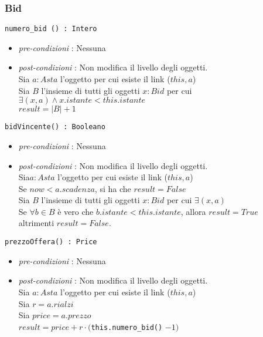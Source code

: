 \documentclass[12pt, letterpaper]{article}
\newcommand{\code}[1]{\colorbox{light-gray}{\texttt{#1}}}
\newcommand{\codee}[1]{\colorbox{white}{\texttt{#1}}}
\begin{document}
\subsubsection{Bid}
\code{numero\_bid () : Intero}\begin{itemize}
    \item \textit{pre-condizioni} : Nessuna
    \item \textit{post-condizioni} : Non modifica il livello degli oggetti.\\ 
    Sia $a:Asta$ l'oggetto per cui esiste il link ($this,a$)\\ 
    Sia $B$ l'insieme di tutti gli oggetti $x:Bid$ per cui $\exists (x,a) \land x.istante<this.istante$\\ 
    $result = |B|+1$ 
\end{itemize}
\code{bidVincente() : Booleano}\begin{itemize}
    \item \textit{pre-condizioni} : Nessuna
    \item \textit{post-condizioni} : Non modifica il livello degli oggetti.\\ 
    Sia$a:Asta$ l'oggetto per cui esiste il link ($this,a$)\\ 
    Se $now<a.scadenza$, si ha che $result=False$\\
    Sia $B$ l'insieme di tutti gli oggetti $x:Bid$ per cui $\exists (x,a)$\\
    Se $\forall b\in B$ è vero che $b.istante<this.istante$, allora $result=True$\\
    altrimenti $result=False$.
\end{itemize}
\code{prezzoOffera() : Price}\begin{itemize}
    \item \textit{pre-condizioni} : Nessuna
    \item \textit{post-condizioni} : Non modifica il livello degli oggetti.\\ 
    Sia $a:Asta$ l'oggetto per cui esiste il link ($this,a$)\\ 
    Sia $r=a.rialzi$\\ 
    Sia $price=a.prezzo$\\
    $result = price + r\cdot ($\codee{this.numero\_bid()} $-1 )$
\end{itemize}
\end{document}
